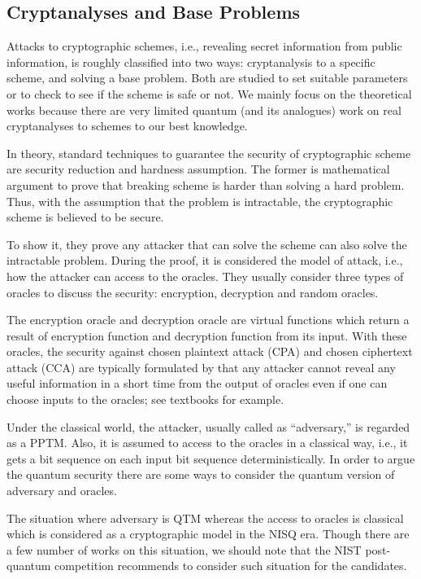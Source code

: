 \subsection{Cryptanalyses and Base Problems}

Attacks to cryptographic schemes, i.e., revealing secret information from public information, is roughly classified into two ways: cryptanalysis to a specific scheme, and solving a base problem.
Both are studied to set suitable parameters or to check to see if the scheme is safe or not.
We mainly focus on the theoretical works
because there are very limited quantum (and its analogues) work \cite{LBC+12,War19,BPF+19} on real cryptanalyses to schemes to our best knowledge.

In theory, standard techniques to guarantee the security of cryptographic scheme 
are security reduction and hardness assumption.
The former is mathematical argument to prove that breaking scheme is harder than solving a hard problem.
Thus, with the assumption that the problem is intractable, 
the cryptographic scheme is believed to be secure.

To show it, they prove any attacker that can solve the scheme can also solve the intractable problem.
During the proof, it is considered the model of attack, i.e., how the attacker can access to the oracles.
They usually consider three types of oracles to discuss the security:  
encryption, decryption and random oracles.

The encryption oracle and decryption oracle are virtual functions which return
a result of encryption function and decryption function from its input.
With these oracles, the security against chosen plaintext attack (CPA) \cite{GM84}
and chosen ciphertext attack (CCA) \cite{NY90,DDN91} are typically 
formulated by that any attacker cannot reveal any useful information in a short time from the output of oracles even if one can choose inputs to the oracles; see textbooks \cite{Gol06book,Gol09book} for example.

Under the classical world, the attacker, usually called as ``adversary,'' is regarded as a PPTM.
Also, it is assumed to access to the oracles in a classical way,
i.e., it gets a bit sequence on each input bit sequence deterministically.
In order to argue the quantum security there are some ways to consider the quantum version of adversary and oracles.

The situation where adversary is QTM whereas the access to oracles is classical which is considered as a cryptographic model in the NISQ era.
Though there are a few number of works \cite{BHN+19} on this situation, 
we should note that the NIST post-quantum competition 
recommends to consider such situation \cite{NISTpqcriteria} for the candidates.

